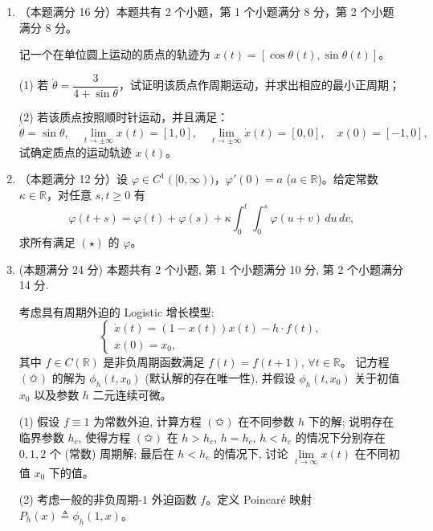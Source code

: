 \begin{enumerate}
    
    \item[7.]（本题满分 16 分）本题共有 2 个小题，第 1 个小题满分 8 分，第 2 个小题满分 8 分。
    
    记一个在单位圆上运动的质点的轨迹为 $x(t) = [\cos \theta (t), \sin \theta (t)]$。
    
    (1) 若 $\dot{\theta} = \dfrac{3}{4 + \sin \theta}$，试证明该质点作周期运动，并求出相应的最小正周期；
    
    (2) 若该质点按照顺时针运动，并且满足：
    \[\dot{\theta} = \sin \theta, \quad \lim_{t \to \pm \infty} x(t) = [1,0], \quad \lim_{t \to \pm \infty} \dot{x}(t) = [0,0], \quad x(0) = [-1,0],\]
    试确定质点的运动轨迹 $x(t)$。
    
    \item[8.] （本题满分 12 分）设 $\varphi \in C^1([0, \infty))$，$\varphi'(0) = a$ ($a \in \mathbb{R}$)。给定常数 $\kappa \in \mathbb{R}$，对任意 $s, t \geq 0$ 有
    \[\varphi(t + s) = \varphi(t) + \varphi(s) + \kappa \int_0^t \int_0^s \varphi(u + v) \, du \, dv,\]
    求所有满足 $(\star)$ 的 $\varphi$。
    
    \item[9.] (本题满分 24 分) 本题共有 2 个小题, 第 1 个小题满分 10 分, 第 2 个小题满分 14 分.
    
    考虑具有周期外迫的 Logistic 增长模型:
    \[\begin{cases}
    \dot{x}(t) = (1 - x(t))x(t) - h \cdot f(t), \\
    x(0) = x_0,
    \end{cases}\tag{✩}\]
    其中 $f \in C(\mathbb{R})$ 是非负周期函数满足 $f(t) = f(t+1)$, $\forall t \in \mathbb{R}$。
    记方程 $(✩)$ 的解为 $\phi_h(t,x_0)$ (默认解的存在唯一性), 并假设 $\phi_h(t,x_0)$ 关于初值 $x_0$ 以及参数 $h$ 二元连续可微。
    
    (1) 假设 $f \equiv 1$ 为常数外迫, 计算方程 $(✩)$ 在不同参数 $h$ 下的解; 
    说明存在临界参数 $h_c$, 使得方程 $(✩)$ 在 $h > h_c$, $h = h_c$, $h < h_c$ 的情况下分别存在 $0,1,2$ 个 (常数) 周期解; 
    最后在 $h < h_c$ 的情况下, 讨论 $\lim\limits_{t \to \infty} x(t)$ 在不同初值 $x_0$ 下的值。
    
    (2) 考虑一般的非负周期-$1$ 外迫函数 $f$。定义 Poincaré 映射 $P_h(x) \triangleq \phi_h(1,x)$。
    

\end{enumerate}
